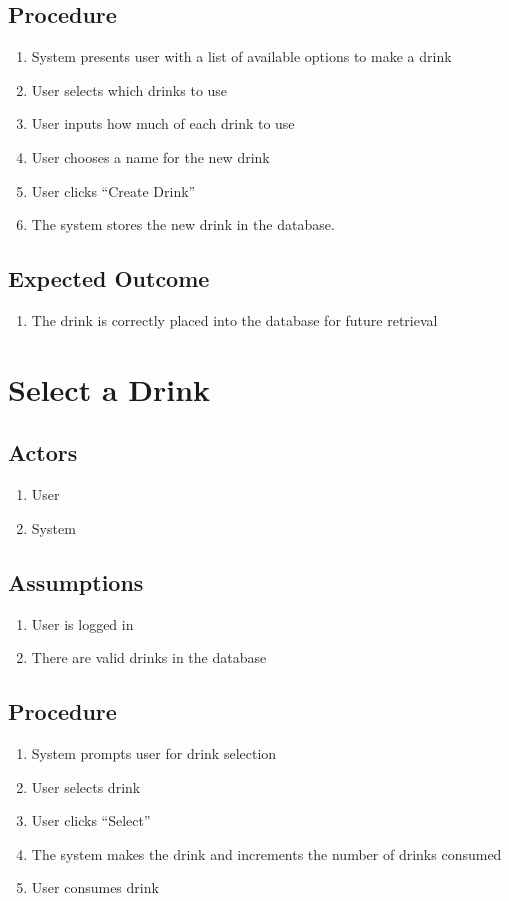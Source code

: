 {\subsection{Procedure}
	\begin{enumerate}
    	\item System presents user with a list of available options to make a drink
    	\item User selects which drinks to use
    	\item User inputs how much of each drink to use
    	\item User chooses a name for the new drink
    	\item User clicks ``Create Drink''
    	\item The system stores the new drink in the database.
    \end{enumerate}
\subsection{Expected Outcome }
	\begin{enumerate}
    	\item The drink is correctly placed into the database for future retrieval
    \end{enumerate}
    
\section{Select a Drink}
\subsection{Actors}
	\begin{enumerate}
    	\item User
    	\item System
    \end{enumerate}
\subsection{Assumptions}
	\begin{enumerate}
    	\item User is logged in
    	\item There are valid drinks in the database
    \end{enumerate}
\subsection{Procedure}
	\begin{enumerate}
    	\item System prompts user for drink selection
    	\item User selects drink
    	\item User clicks ``Select''
    	\item The system makes the drink and increments the number of drinks consumed
    	\item User consumes drink
    \end{enumerate}
}
